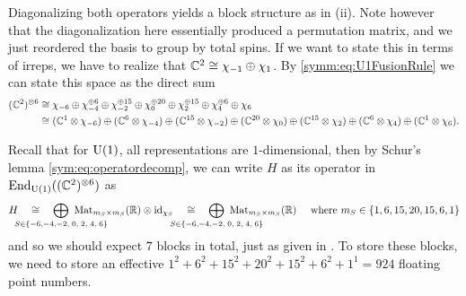 Diagonalizing both operators yields a block structure as in
(ii). Note however that the diagonalization here
essentially produced a permutation matrix, and we just reordered the basis to
group by total spins. If we want to state this in terms of irreps, we have to
realize that $\mathbb{C}^2 \cong \chi_{-1}
\oplus \chi_{1}$. By \cref{symm:eq:U1FusionRule} we can state this space as the
direct sum
\begin{align*}
  (\mathbb{C}^2)^{\otimes 6} 
  &\cong
  \chi_{-6} \oplus \chi_{-4}^{\oplus 6} \oplus \chi_{-2}^{\oplus 15} \oplus \chi_{0}^{\oplus 20} \oplus \chi_{2}^{\oplus 15} \oplus \chi_4^{\oplus 6} \oplus \chi_6 \\
  &\cong
  (\mathbb{C}^1 \otimes \chi_{-6}) \oplus (\mathbb{C}^6 \otimes \chi_{-4}) \oplus (\mathbb{C}^{15} \otimes \chi_{-2}) \oplus (\mathbb{C}^{20} \otimes \chi_{0}) \oplus (\mathbb{C}^{15} \otimes \chi_2) \oplus (\mathbb{C}^6 \otimes \chi_4) \oplus (\mathbb{C}^1 \otimes \chi_6).
\end{align*}
  

Recall that for $\mathrm{U}(1)$, all representations are $1$-dimensional, then by
Schur's lemma \eqref{sym:eq:operatordecomp}, we can write $H$ as its operator in
$\operatorname{End}_{\mathrm{U}(1)}((\mathbb{C}^2)^{\otimes 6})$ as
\[
  H 
  \quad\cong\quad 
  \bop_{\mathclap{S \in \{-6,-4,-2,\;0,\;2,\;4,\;6\}}}\,\, 
  \Mat{m_S}{m_S}{\R}  \ot \id_{\chi_S} 
  \quad\cong\quad 
  \bop_{\mathclap{S \in \{-6,-4,-2,\;0,\;2,\;4,\;6\}}}\,\, 
  \Mat{m_S}{m_S}{\R}  
  \quad 
  \text{ where } 
  m_S \in \{1, 6, 15, 20, 15, 6, 1\}
\]
and so we should expect $7$ blocks in total, just as given in
. To store these blocks, we need to store an
effective $1^2 + 6^2 + 15^2 + 20^2 + 15^2 + 6^2 + 1^1 = 924$ floating point
numbers.


